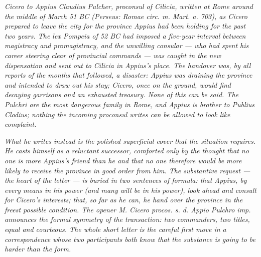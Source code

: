 
\textit{Cicero to Appius Claudius Pulcher, proconsul of Cilicia,
written at Rome around the middle of March 51 BC (Perseus:
\textit{Romae circ. m. Mart. a. 703}), as Cicero prepared to leave
the city for the province Appius had been holding for the past
two years. The lex Pompeia of 52 BC had imposed a five-year
interval between magistracy and promagistracy, and the unwilling
consular --- who had spent his career steering clear of
provincial commands --- was caught in the new dispensation and
sent out to Cilicia in Appius's place. The handover was, by all
reports of the months that followed, a disaster: Appius was
draining the province and intended to draw out his stay; Cicero,
once on the ground, would find decaying garrisons and an
exhausted treasury. None of this can be said. The Pulchri are
the most dangerous family in Rome, and Appius is brother to
Publius Clodius; nothing the incoming proconsul writes can be
allowed to look like complaint.}

\textit{What he writes instead is the polished superficial cover
that the situation requires. He casts himself as a reluctant
successor, comforted only by the thought that no one is more
Appius's friend than he and that no one therefore would be more
likely to receive the province in good order from him. The
substantive request --- the heart of the letter --- is buried in
two sentences of formula: that Appius, by every means in his
power (and many will be in his power), look ahead and consult
for Cicero's interests; that, so far as he can, he hand over the
province in the freest possible condition. The opener
\textit{M. Cicero procos. s. d. Appio Pulchro imp.} announces
the formal symmetry of the transaction: two commanders, two
titles, equal and courteous. The whole short letter is the
careful first move in a correspondence whose two participants
both know that the substance is going to be harder than the
form.}
